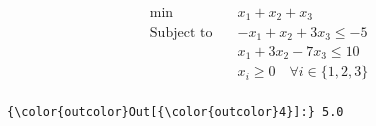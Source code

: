 \begin{align*}\min\quad & x_{1} + x_{2} + x_{3}\\
\text{Subject to} \quad & -x_{1} + x_{2} + 3 x_{3} \leq -5\\
 & x_{1} + 3 x_{2} - 7 x_{3} \leq 10\\
 & x_{i} \geq 0 \quad\forall i \in \{1,2,3\}\\
\end{align*}


    
\begin{Verbatim}[commandchars=\\\{\}]
{\color{outcolor}Out[{\color{outcolor}4}]:} 5.0
\end{Verbatim}
            

    
    